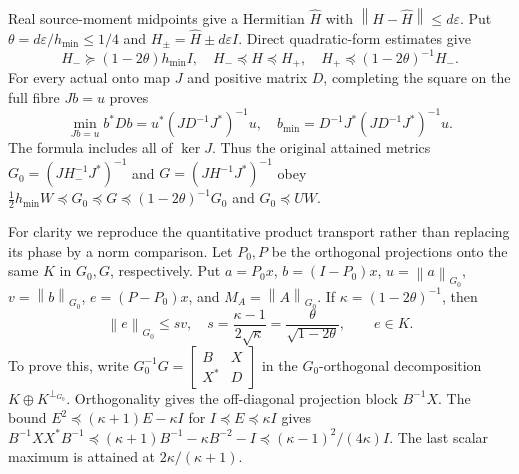 \documentclass[11pt]{article}
\newcommand{\norm}[1]{\left\lVert#1\right\rVert}
\begin{document}
Real source-moment midpoints give a Hermitian $\widehat H$ with
$\norm{H-\widehat H}\le d\varepsilon$. Put
$\theta=d\varepsilon/h_{\min}\le1/4$ and
$H_\pm=\widehat H\pm d\varepsilon I$.
Direct quadratic-form estimates give
\[
 H_-\succeq(1-2\theta)h_{\min}I,\quad
 H_-\preceq H\preceq H_+,\quad
 H_+\preceq(1-2\theta)^{-1}H_-.
\]
For every actual onto map $J$ and positive matrix $D$, completing
the square on the full fibre $Jb=u$ proves
\[
 \min_{Jb=u}b^*Db=u^*(JD^{-1}J^*)^{-1}u,\quad
 b_{\min}=D^{-1}J^*(JD^{-1}J^*)^{-1}u.
\]
The formula includes all of $\ker J$. Thus the original attained
metrics $G_0=(JH_-^{-1}J^*)^{-1}$ and
$G=(JH^{-1}J^*)^{-1}$ obey
$\frac12h_{\min}W\preceq G_0\preceq G
\preceq(1-2\theta)^{-1}G_0$ and $G_0\preceq UW$.

For clarity we reproduce the quantitative product transport rather
than replacing its phase by a norm comparison. Let $P_0,P$ be the
orthogonal projections onto the same $K$ in $G_0,G$, respectively.
Put $a=P_0x$, $b=(I-P_0)x$, $u=\norm a_{G_0}$, $v=\norm b_{G_0}$,
$e=(P-P_0)x$, and $M_A=\norm A_{G_0}$.
If $\kappa=(1-2\theta)^{-1}$, then
\[
 \norm e_{G_0}\le sv,\quad
 s=\frac{\kappa-1}{2\sqrt\kappa}
  =\frac{\theta}{\sqrt{1-2\theta}},\qquad e\in K.
\]
To prove this, write $G_0^{-1}G=\left[\begin{smallmatrix}B&X\\X^*&D
\end{smallmatrix}\right]$ in the $G_0$-orthogonal decomposition
$K\oplus K^{\perp_{G_0}}$. Orthogonality gives the off-diagonal
projection block $B^{-1}X$. The bound
$E^2\preceq(\kappa+1)E-\kappa I$ for $I\preceq E\preceq\kappa I$
gives
$B^{-1}XX^*B^{-1}\preceq
(\kappa+1)B^{-1}-\kappa B^{-2}-I
\preceq(\kappa-1)^2/(4\kappa)I$.
The last scalar maximum is attained at $2\kappa/(\kappa+1)$.
\end{document}
